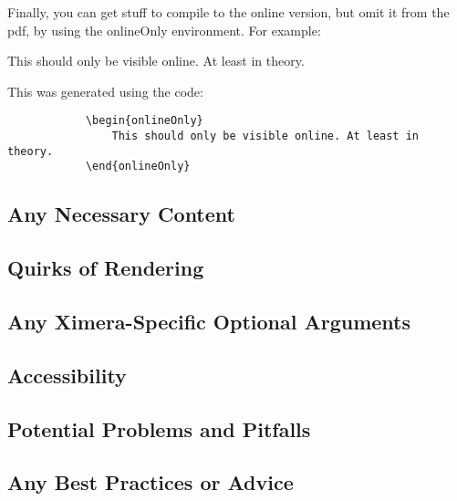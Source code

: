 \documentclass{ximera}
\begin{document}
        Finally, you can get stuff to compile to the online version, but omit it from the pdf, by using the onlineOnly environment. For example:
        
        \begin{onlineOnly}
            This should only be visible online. At least in theory.
        \end{onlineOnly}
        
        This was generated using the code:
        
        \begin{verbatim}
            \begin{onlineOnly}
                This should only be visible online. At least in theory.
            \end{onlineOnly}
        \end{verbatim}
    
    \subsection*{Any Necessary Content}
    
    
    
    \subsection*{Quirks of Rendering}
    
    
    
    \subsection*{Any Ximera-Specific Optional Arguments}
    
    
    
    \subsection*{Accessibility}
    
    
    
    \subsection*{Potential Problems and Pitfalls}
    
    
    
    \subsection*{Any Best Practices or Advice}
    
    
    
\end{document}
